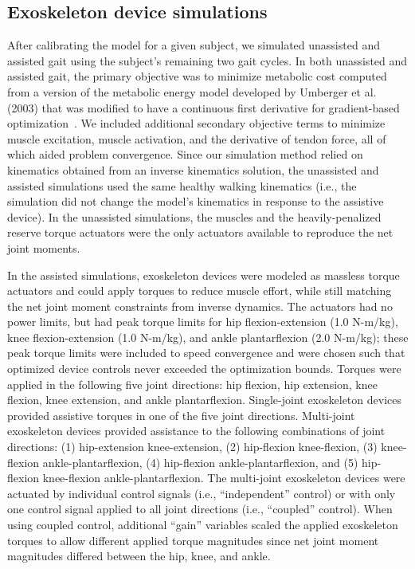 \documentclass[10pt,letterpaper]{article}
\begin{document}
\subsection*{Exoskeleton device simulations}
After calibrating the model for a given subject, we simulated unassisted and assisted gait using the subject’s remaining two gait cycles. In both unassisted and assisted gait, the primary objective was to minimize metabolic cost computed from a version of the metabolic energy model developed by Umberger et al. (2003) that was modified to have a continuous first derivative for gradient-based optimization~\cite{Umberger:2003, Koelewijn:2018}. We included additional secondary objective terms to minimize muscle excitation, muscle activation, and the derivative of tendon force, all of which aided problem convergence. Since our simulation method relied on kinematics obtained from an inverse kinematics solution, the unassisted and assisted simulations used the same healthy walking kinematics (i.e., the simulation did not change the model's kinematics in response to the assistive device). In the unassisted simulations, the muscles and the heavily-penalized reserve torque actuators were the only actuators available to reproduce the net joint moments.
 
In the assisted simulations, exoskeleton devices were modeled as massless torque actuators and could apply torques to reduce muscle effort, while still matching the net joint moment constraints from inverse dynamics. The actuators had no power limits, but had peak torque limits for hip flexion-extension (1.0 N-m/kg), knee flexion-extension (1.0 N-m/kg), and ankle plantarflexion (2.0 N-m/kg); these peak torque limits were included to speed convergence and were chosen such that optimized device controls never exceeded the optimization bounds. Torques were applied in the following five joint directions: hip flexion, hip extension, knee flexion, knee extension, and ankle plantarflexion. Single-joint exoskeleton devices provided assistive torques in one of the five joint directions. Multi-joint exoskeleton devices provided assistance to the following combinations of joint directions: (1) hip-extension knee-extension, (2) hip-flexion knee-flexion, (3) knee-flexion ankle-plantarflexion, (4) hip-flexion ankle-plantarflexion, and (5) hip-flexion knee-flexion ankle-plantarflexion. The multi-joint exoskeleton devices were actuated by individual control signals (i.e., ``independent'' control) or with only one control signal applied to all joint directions (i.e., ``coupled'' control). When using coupled control, additional ``gain'' variables scaled the applied exoskeleton torques to allow different applied torque magnitudes since net joint moment magnitudes differed between the hip, knee, and ankle.
 
\end{document}
